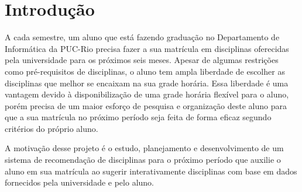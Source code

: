
\chapter{Introdução}

A cada semestre, um aluno que está fazendo graduação no Departamento de Informática da PUC-Rio precisa fazer a sua matrícula em disciplinas oferecidas pela universidade para os próximos seis meses. Apesar de algumas restrições como pré-requisitos de disciplinas, o aluno tem ampla liberdade de escolher as disciplinas que melhor se encaixam na sua grade horária. Essa liberdade é uma vantagem devido à disponibilização de uma grade horária flexível para o aluno, porém precisa de um maior esforço de pesquisa e organização deste aluno para que a sua matrícula no próximo período seja feita de forma eficaz segundo critérios do próprio aluno. 

A motivação desse projeto é o estudo, planejamento e desenvolvimento de um sistema de recomendação de disciplinas para o próximo período que auxilie o aluno em sua matrícula ao sugerir interativamente disciplinas com base em dados fornecidos pela universidade e pelo aluno.